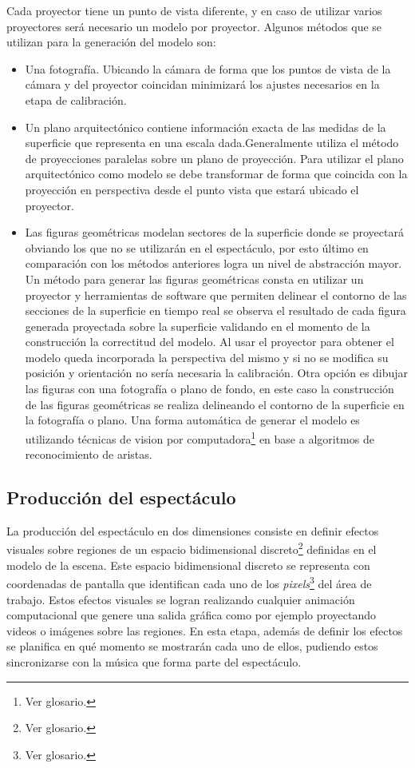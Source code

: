 Cada proyector tiene un punto de vista diferente, y en caso de utilizar varios proyectores será necesario un modelo por proyector.
Algunos métodos que se utilizan para la generación del modelo son:
\begin{itemize}
  \item Una fotografía. Ubicando la cámara de forma que los puntos de vista de la cámara y del proyector coincidan minimizará los ajustes necesarios en la etapa de calibración.
  \item Un plano arquitectónico contiene información exacta de las medidas de la superficie que representa en una escala dada.Generalmente utiliza el método de proyecciones paralelas \cite{LibroCompGrafica} sobre un plano de proyección. Para utilizar el plano arquitectónico como modelo se debe transformar de forma que coincida con la proyección en perspectiva desde el punto vista que estará ubicado el proyector.
  \item Las figuras geométricas modelan sectores de la superficie donde se proyectará obviando los que no se utilizarán en el espectáculo, por esto último en comparación con los métodos anteriores logra un nivel de abstracción mayor.
Un método para generar las figuras geométricas consta en utilizar un proyector y herramientas de software que permiten delinear el contorno de las secciones de la superficie en tiempo real se observa el resultado de cada figura generada proyectada sobre la superficie validando en el momento de la construcción la correctitud del modelo. Al usar el proyector para obtener el modelo queda incorporada la perspectiva del mismo y si no se modifica su posición y orientación no sería necesaria la calibración.
Otra opción es dibujar las figuras con una fotografía o plano de fondo, en este caso la construcción de las figuras geométricas se realiza delineando el contorno de la superficie en la fotografía o plano.
Una forma automática de generar el modelo es utilizando técnicas de vision por computadora\footnote{Ver glosario.} en base a algoritmos de reconocimiento de aristas.
\end{itemize}
\subsection{Producción del espectáculo}
La producción del espectáculo en dos dimensiones consiste en definir efectos visuales sobre regiones de un espacio bidimensional discreto\footnote{Ver glosario.} definidas en el modelo de la escena. Este espacio bidimensional discreto se representa con coordenadas de pantalla que identifican cada uno de los \emph{pixels}\footnote{Ver glosario.} del área de trabajo. Estos efectos visuales se logran realizando cualquier animación computacional que genere una salida gráfica como por ejemplo proyectando videos o imágenes sobre las regiones.
En esta etapa, además de definir los efectos se planifica en qué momento se mostrarán cada uno de ellos, pudiendo estos sincronizarse con la música que forma parte del espectáculo.

